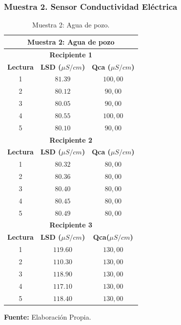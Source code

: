 \subsubsection{Muestra 2. Sensor Conductividad El\'ectrica }
    \begin{table}[H]
        \protect\caption[Muestra 2: Agua de pozo ]{Muestra 2: Agua de pozo.}
        \label{tab:CEMuestra2}
        \centering
        \begin{tabular}{c c c }
            \hline
            \multicolumn{3}{c}{\textbf{Muestra 2: Agua de pozo}} \\
             \hline
            \multicolumn{3}{c}{\textbf{Recipiente 1}} \\
            \hline
            \textbf{Lectura}&\textbf{LSD ($\mu S/cm$)}&\textbf{Qca ($\mu S/cm$)} \\
            \hline
            {1}& $81.39$&$100,00$ \\ 
            {2}& $80.12$&$90,00$ \\ 
            {3}&$80.05$&$90,00$\\  
            {4}& $80.55$&$100,00$\\ 
            {5}& $80.10$&$90,00$ \\
            \hline
                       \multicolumn{3}{c}{\textbf{Recipiente 2}} \\
            \hline
            \textbf{Lectura}&\textbf{LSD ($\mu S/cm$)}&\textbf{Qca ($\mu S/cm$)} \\
            \hline
            {1}& $80.32$&$80,00$ \\ 
            {2}& $80.36$&$80,00$ \\ 
            {3}&$80.40$&$80,00$  \\  
            {4}& $80.45$&$80,00$ \\ 
            {5}& $80.49$&$80,00$ \\ 
            \hline
            \multicolumn{3}{c}{\textbf{Recipiente 3}} \\
            \hline
            \textbf{Lectura}&\textbf{LSD ($\mu S/cm$)}&\textbf{Qca($\mu S/cm$)} \\
            \hline
            {1}& $119.60$&$130,00$ \\ 
            {2}& $110.30$&$130,00$ \\ 
            {3}&$118.90$&$130,00$  \\  
            {4}& $117.10$&$130,00$ \\ 
            {5}& $118.40$&$130,00$ \\ 
            \hline
        \end{tabular}
        \vspace{5mm}
        \newline
        \hfill \textbf{Fuente: }Elaboración Propia.
    \end{table}

